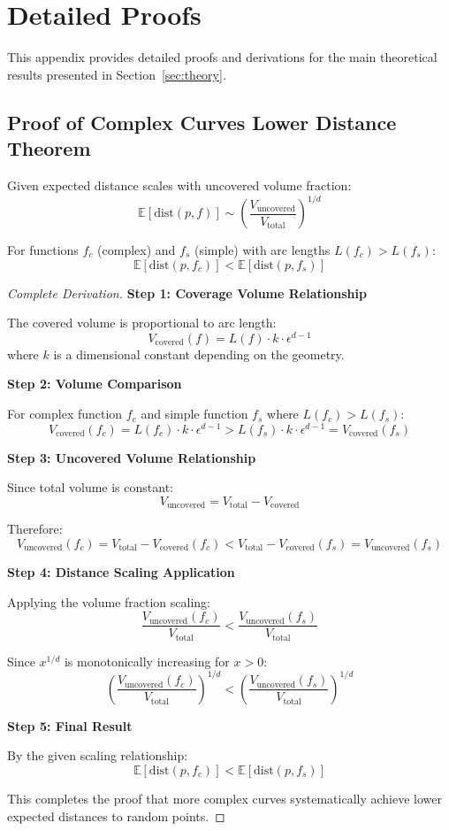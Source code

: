 \section{Detailed Proofs}
\label{sec:detailed-proofs}

This appendix provides detailed proofs and derivations for the main theoretical results presented in Section~\ref{sec:theory}.

\subsection{Proof of Complex Curves Lower Distance Theorem}
\label{subsec:complex-curves-proof}

\begin{theorem}
Given expected distance scales with uncovered volume fraction:
$$\mathbb{E}[\text{dist}(p, f)] \sim \left(\frac{V_{\text{uncovered}}}{V_{\text{total}}}\right)^{1/d}$$

For functions $f_c$ (complex) and $f_s$ (simple) with arc lengths $L(f_c) > L(f_s)$:
$$\mathbb{E}[\text{dist}(p, f_c)] < \mathbb{E}[\text{dist}(p, f_s)]$$
\end{theorem}

\begin{proof}[Complete Derivation]
\textbf{Step 1: Coverage Volume Relationship}

The covered volume is proportional to arc length:
$$V_{\text{covered}}(f) = L(f) \cdot k \cdot \epsilon^{d-1}$$
where $k$ is a dimensional constant depending on the geometry.

\textbf{Step 2: Volume Comparison}

For complex function $f_c$ and simple function $f_s$ where $L(f_c) > L(f_s)$:
$$V_{\text{covered}}(f_c) = L(f_c) \cdot k \cdot \epsilon^{d-1} > L(f_s) \cdot k \cdot \epsilon^{d-1} = V_{\text{covered}}(f_s)$$

\textbf{Step 3: Uncovered Volume Relationship}

Since total volume is constant:
$$V_{\text{uncovered}} = V_{\text{total}} - V_{\text{covered}}$$

Therefore:
$$V_{\text{uncovered}}(f_c) = V_{\text{total}} - V_{\text{covered}}(f_c) < V_{\text{total}} - V_{\text{covered}}(f_s) = V_{\text{uncovered}}(f_s)$$

\textbf{Step 4: Distance Scaling Application}

Applying the volume fraction scaling:
$$\frac{V_{\text{uncovered}}(f_c)}{V_{\text{total}}} < \frac{V_{\text{uncovered}}(f_s)}{V_{\text{total}}}$$

Since $x^{1/d}$ is monotonically increasing for $x > 0$:
$$\left(\frac{V_{\text{uncovered}}(f_c)}{V_{\text{total}}}\right)^{1/d} < \left(\frac{V_{\text{uncovered}}(f_s)}{V_{\text{total}}}\right)^{1/d}$$

\textbf{Step 5: Final Result}

By the given scaling relationship:
$$\mathbb{E}[\text{dist}(p, f_c)] < \mathbb{E}[\text{dist}(p, f_s)]$$

This completes the proof that more complex curves systematically achieve lower expected distances to random points.
\end{proof}


